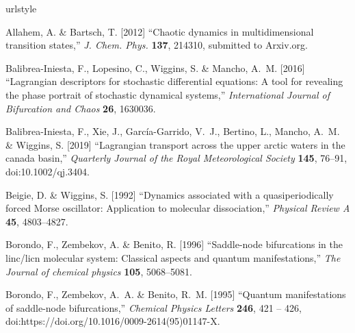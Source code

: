 \documentclass{ws-ijbc}
\begin{document}
\begin{thebibliography}{76}
	\newcommand{\enquote}[1]{``#1''}
	\providecommand{\natexlab}[1]{#1}
	\providecommand{\url}[1]{\texttt{#1}}
	\providecommand{\urlprefix}{URL }
	\expandafter\ifx\csname urlstyle\endcsname\relax
	\providecommand{\doi}[1]{doi:\discretionary{}{}{}#1}\else
	\providecommand{\doi}{doi:\discretionary{}{}{}\begingroup
		\urlstyle{rm}\Url}\fi
	
	Allahem, A. \& Bartsch, T. [2012] \enquote{Chaotic dynamics in multidimensional
		transition states,} \emph{J. Chem. Phys.} \textbf{137},  214310, submitted to
	Arxiv.org.
	
	Balibrea-Iniesta, F., Lopesino, C., Wiggins, S. \& Mancho, A.~M. [2016]
	\enquote{Lagrangian descriptors for stochastic differential equations: A tool
		for revealing the phase portrait of stochastic dynamical systems,}
	\emph{International Journal of Bifurcation and Chaos} \textbf{26},  1630036.
	
	Balibrea-Iniesta, F., Xie, J., Garc\'{i}a-Garrido, V.~J., Bertino, L., Mancho,
	A.~M. \& Wiggins, S. [2019] \enquote{Lagrangian transport across the upper
		arctic waters in the canada basin,} \emph{Quarterly Journal of the Royal
		Meteorological Society} \textbf{145},  76--91, \doi{10.1002/qj.3404}.
	
	Beigie, D. \& Wiggins, S. [1992] \enquote{Dynamics associated with a
		quasiperiodically forced {Morse} oscillator: {Application} to molecular
		dissociation,} \emph{Physical Review A} \textbf{45},  4803--4827.
	
	Borondo, F., Zembekov, A. \& Benito, R. [1996] \enquote{Saddle-node
		bifurcations in the linc/licn molecular system: Classical aspects and quantum
		manifestations,} \emph{The Journal of chemical physics} \textbf{105},
	5068--5081.
	
	Borondo, F., Zembekov, A.~A. \& Benito, R.~M. [1995] \enquote{Quantum
		manifestations of saddle-node bifurcations,} \emph{Chemical Physics Letters}
	\textbf{246},  421 -- 426,
	\doi{https://doi.org/10.1016/0009-2614(95)01147-X}.
	

\end{thebibliography}
\end{document}

